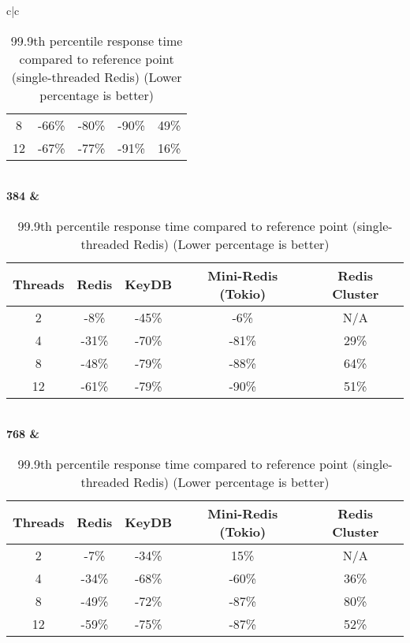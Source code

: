 \begin{center}
\begin{table}
\begin{tabular}{c|c}
\begin{tabular}{c|cccc}
                8 &  -66\% &  -80\% &               -90\% &           49\% \\
               12 &  -67\% &  -77\% &               -91\% &           16\% \\
                \bottomrule
            \end{tabular} \\
            \bf{384} & \begin{tabular}{c|cccc}
                \toprule
                Threads & Redis & KeyDB & Mini-Redis (Tokio) & Redis Cluster \\
                \midrule
                2 &   -8\% &  -45\% &                -6\% &           N/A \\
                4 &  -31\% &  -70\% &               -81\% &           29\% \\
                8 &  -48\% &  -79\% &               -88\% &           64\% \\
               12 &  -61\% &  -79\% &               -90\% &           51\% \\
                \bottomrule
            \end{tabular} \\
            \bf{768} & \begin{tabular}{c|cccc}
                \toprule
                Threads & Redis & KeyDB & Mini-Redis (Tokio) & Redis Cluster \\
                \midrule
                2 &   -7\% &  -34\% &                15\% &           N/A \\
                4 &  -34\% &  -68\% &               -60\% &           36\% \\
                8 &  -49\% &  -72\% &               -87\% &           80\% \\
               12 &  -59\% &  -75\% &               -87\% &           52\% \\
                \bottomrule
            \end{tabular} \\
            \bottomrule
        \end{tabular}
        \caption{99.9th percentile response time compared to reference point (single-threaded Redis) (Lower percentage is better)}
        \label{tbl:table_of_figures_999_response_times}
    \end{table}
\end{center}


